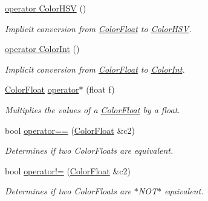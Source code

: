 \begin{DoxyCompactItemize}
\hyperlink{structtsgl_1_1_color_float_a4d74b061239eed7eb351422c18e33a37}{operator Color\-H\-S\-V} ()
\begin{DoxyCompactList}\small\item\em \-Implicit conversion from \hyperlink{structtsgl_1_1_color_float}{\-Color\-Float} to \hyperlink{structtsgl_1_1_color_h_s_v}{\-Color\-H\-S\-V}. \end{DoxyCompactList}\item 
\hyperlink{structtsgl_1_1_color_float_a4ef5398fd1ee469dd9b1b43c9ce5c00d}{operator Color\-Int} ()
\begin{DoxyCompactList}\small\item\em \-Implicit conversion from \hyperlink{structtsgl_1_1_color_float}{\-Color\-Float} to \hyperlink{structtsgl_1_1_color_int}{\-Color\-Int}. \end{DoxyCompactList}\item 
\hyperlink{structtsgl_1_1_color_float}{\-Color\-Float} \hyperlink{structtsgl_1_1_color_float_a09d7cc47ac3d0e23ef7339ccf33111a5}{operator$\ast$} (float f)
\begin{DoxyCompactList}\small\item\em \-Multiplies the values of a \hyperlink{structtsgl_1_1_color_float}{\-Color\-Float} by a float. \end{DoxyCompactList}\item 
bool \hyperlink{structtsgl_1_1_color_float_ac29ecf4a36624050af433d691e65651c}{operator==} (\hyperlink{structtsgl_1_1_color_float}{\-Color\-Float} \&c2)
\begin{DoxyCompactList}\small\item\em \-Determines if two \-Color\-Floats are equivalent. \end{DoxyCompactList}\item 
bool \hyperlink{structtsgl_1_1_color_float_afd92fcf8743d931cfbcf405209c923fc}{operator!=} (\hyperlink{structtsgl_1_1_color_float}{\-Color\-Float} \&c2)
\begin{DoxyCompactList}\small\item\em \-Determines if two \-Color\-Floats are $\ast$\-N\-O\-T$\ast$ equivalent. \end{DoxyCompactList}\end{DoxyCompactItemize}
